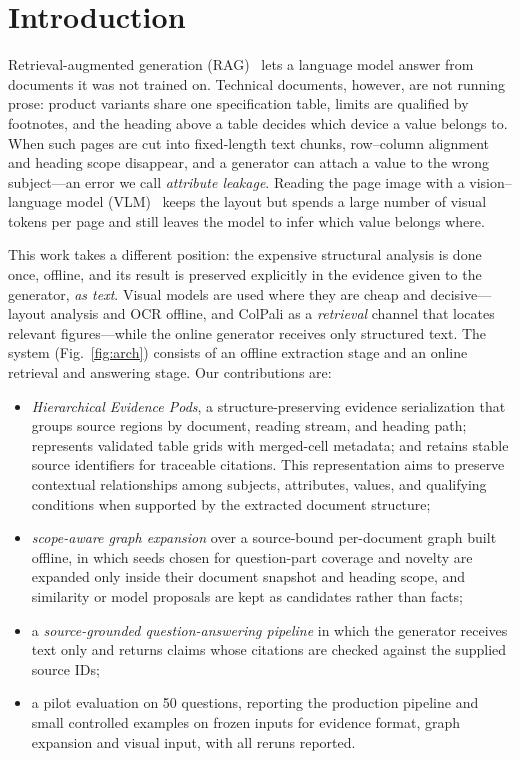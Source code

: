 \documentclass[runningheads]{llncs}
\begin{document}
\section{Introduction}
Retrieval-augmented generation (RAG)~\cite{lewis2020rag} lets a language model answer from documents it was not trained on. Technical documents, however, are not running prose: product variants share one specification table, limits are qualified by footnotes, and the heading above a table decides which device a value belongs to. When such pages are cut into fixed-length text chunks, row--column alignment and heading scope disappear, and a generator can attach a value to the wrong subject---an error we call \emph{attribute leakage}. Reading the page image with a vision--language model (VLM)~\cite{mathew2021docvqa,bai2025qwen25vl} keeps the layout but spends a large number of visual tokens per page and still leaves the model to infer which value belongs where.

This work takes a different position: the expensive structural analysis is done once, offline, and its result is preserved explicitly in the evidence given to the generator, \emph{as text}. Visual models are used where they are cheap and decisive---layout analysis and OCR offline, and ColPali as a \emph{retrieval} channel that locates relevant figures---while the online generator receives only structured text. The system (Fig.~\ref{fig:arch}) consists of an offline extraction stage and an online retrieval and answering stage. Our contributions are:
\begin{itemize}
\item \emph{Hierarchical Evidence Pods}, a structure-preserving evidence serialization that groups source regions by document, reading stream, and heading path; represents validated table grids with merged-cell metadata; and retains stable source identifiers for traceable citations. This representation aims to preserve contextual relationships among subjects, attributes, values, and qualifying conditions when supported by the extracted document structure;
\item \emph{scope-aware graph expansion} over a source-bound per-document graph built offline, in which seeds chosen for question-part coverage and novelty are expanded only inside their document snapshot and heading scope, and similarity or model proposals are kept as candidates rather than facts;
\item a \emph{source-grounded question-answering pipeline} in which the generator receives text only and returns claims whose citations are checked against the supplied source IDs;
\item a pilot evaluation on 50 questions, reporting the production pipeline and small controlled examples on frozen inputs for evidence format, graph expansion and visual input, with all reruns reported.
\end{itemize}
\end{document}
